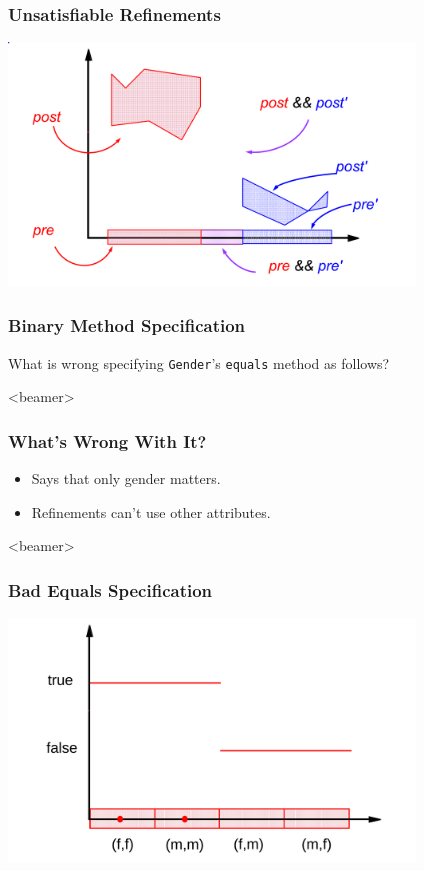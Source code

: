 \begin{frame}
\frametitle{Unsatisfiable Refinements}
\transdissolve[duration=0.5]
\includegraphics[width=4.25in]{unsatisfiable2}
\end{frame}

\begin{frame}[fragile]
\frametitle{Binary Method Specification}
\begin{question}
What is wrong specifying \lstinline!Gender!'s \lstinline!equals!
method as follows?

\rm

\end{question}
\end{frame}

\begin{frame}<beamer>
\frametitle{What's Wrong With It?}
\begin{itemize}
\item
Says that only gender matters.

\item
Refinements \alert{can't} use other attributes.
\end{itemize}
\end{frame}

\begin{frame}<beamer>
\frametitle{Bad Equals Specification}
\includegraphics[width=4.25in]{equalsbad1}
\end{frame}

